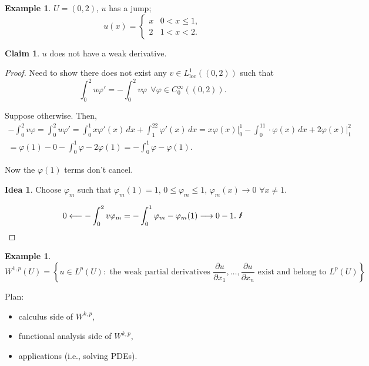 \documentclass[12pt]{article}
\theoremstyle{definition}
\newtheorem*{claim*}{Claim}
\newtheorem*{idea}{Idea}
\newtheorem{example}{Example}
\newtheorem*{example*}{Example}
\begin{document}
\begin{example}
$U=(0,2)$, $u$ has a jump;
\[u(x)=\left\{\begin{array}{ll}x&0<x\leq1,\\2&1<x<2.\end{array}\right.\]

\begin{claim*}
$u$ does not have a weak derivative.
\end{claim*}

\begin{proof}
Need to show there does not exist any $v\in L_\text{loc}^1((0,2))$ such that
\[\int_0^2u\varphi'=-\int_0^2v\varphi\ \ \forall\varphi\in C_0^\infty((0,2)).\]

Suppose otherwise. Then,
\begin{multline*}
-\int_0^2v\varphi=\int_0^2u\varphi'=\int_0^1x\varphi'(x)\,dx+\int_1^22\varphi'(x)\,dx=x\varphi(x)\Big|_0^1-\int_0^11\cdot\varphi(x)\,dx+2\varphi(x)\Big|_1^2\\
=\varphi(1)-0-\int_0^1\varphi-2\varphi(1)=-\int_0^1\varphi-\varphi(1).
\end{multline*}

Now the $\varphi(1)$ terms don't cancel.

\begin{idea}
Choose $\varphi_m$ such that $\varphi_m(1)=1$, $0\leq\varphi_m\leq1$, $\varphi_m(x)\rightarrow0$ $\forall x\neq1$.
\end{idea}
\[0\longleftarrow-\int_0^2v\varphi_m=-\int_0^1\varphi_m-\varphi_m(1)\longrightarrow0-1.\ \text{\Lightning}\]
\end{proof}
\end{example}

\begin{example*}
\[W^{1,p}(U)=\left\{u\in L^p(U):\text{ the weak partial derivatives }\frac{\partial u}{\partial x_1},\ldots,\frac{\partial u}{\partial x_n}\text{ exist and belong to }L^p(U)\right\}\]
\end{example*}

Plan:
\begin{itemize}[label=$-$]
\item calculus side of $W^{k,p}$,
\item functional analysis side of $W^{k,p}$,
\item applications (i.e., solving PDEs).
\end{itemize}
\end{document}
